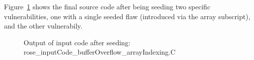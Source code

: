 Figure~\ref{Tutorial:exampleOutput_bufferOverflow} shows the final
source code after being seeding two specific vulnerabilities, one
with a single seeded flaw (introduced via the array subscript), and
the other vulnerabily.
    

\begin{figure}[h!]
{\indent
{\mySmallestFontSize

\begin{latexonly}
   
\end{latexonly}

\begin{htmlonly}
   
\end{htmlonly}

}
}
\caption{Output of input code after seeding: rose\_inputCode\_bufferOverflow\_arrayIndexing.C}
\label{Tutorial:exampleOutput_bufferOverflow}
\end{figure}

